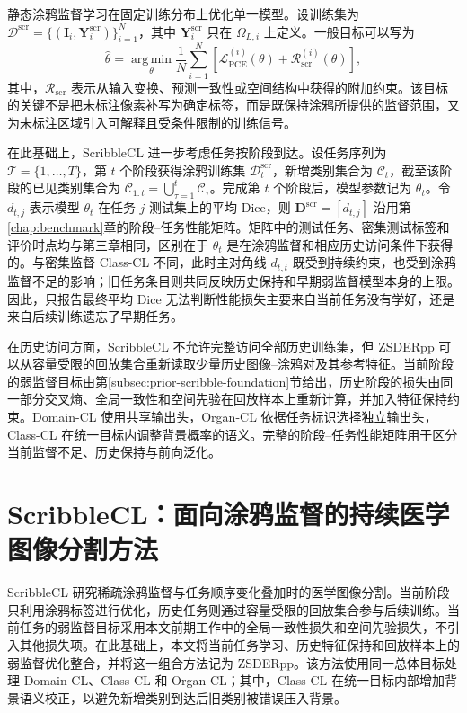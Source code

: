 静态涂鸦监督学习在固定训练分布上优化单一模型。设训练集为
$\mathcal{D}^{\mathrm{scr}}=\{(\mathbf{I}_i,\mathbf{Y}^{\mathrm{scr}}_i)\}_{i=1}^{N}$，其中
$\mathbf{Y}^{\mathrm{scr}}_i$ 只在 $\Omega_{L,i}$ 上定义。一般目标可以写为
\begin{equation}
\widehat{\theta}
=
\operatorname*{arg\,min}_{\theta}
\frac{1}{N}\sum_{i=1}^{N}
\left[
\mathcal{L}_{\mathrm{PCE}}^{(i)}(\theta)
+
\mathcal{R}_{\mathrm{scr}}^{(i)}(\theta)
\right],
\label{eq:scribble-static-objective}
\end{equation}
其中，$\mathcal{R}_{\mathrm{scr}}$ 表示从输入变换、预测一致性或空间结构中获得的附加约束。该目标的关键不是把未标注像素补写为确定标签，而是既保持涂鸦所提供的监督范围，又为未标注区域引入可解释且受条件限制的训练信号。

在此基础上，ScribbleCL 进一步考虑任务按阶段到达。设任务序列为
$\mathcal{T}=\{1,\ldots,T\}$，第 $t$ 个阶段获得涂鸦训练集
$\mathcal{D}^{\mathrm{scr}}_t$，新增类别集合为 $\mathcal{C}_t$，截至该阶段的已见类别集合为
$\mathcal{C}_{1:t}=\bigcup_{\tau=1}^{t}\mathcal{C}_{\tau}$。完成第 $t$ 个阶段后，模型参数记为 $\theta_t$。令
$d_{t,j}$ 表示模型 $\theta_t$ 在任务 $j$ 测试集上的平均 Dice，则
$\mathbf{D}^{\mathrm{scr}}=[d_{t,j}]$ 沿用第\ref{chap:benchmark}章的阶段--任务性能矩阵。矩阵中的测试任务、密集测试标签和评价时点均与第三章相同，区别在于 $\theta_t$ 是在涂鸦监督和相应历史访问条件下获得的。与密集监督 Class-CL 不同，此时主对角线 $d_{t,t}$ 既受到持续约束，也受到涂鸦监督不足的影响；旧任务条目则共同反映历史保持和早期弱监督模型本身的上限。因此，只报告最终平均 Dice 无法判断性能损失主要来自当前任务没有学好，还是来自后续训练遗忘了早期任务。

在历史访问方面，ScribbleCL 不允许完整访问全部历史训练集，但 ZSDERpp 可以从容量受限的回放集合重新读取少量历史图像--涂鸦对及其参考特征。当前阶段的弱监督目标由第\ref{subsec:prior-scribble-foundation}节给出，历史阶段的损失由同一部分交叉熵、全局一致性和空间先验在回放样本上重新计算，并加入特征保持约束。Domain-CL 使用共享输出头，Organ-CL 依据任务标识选择独立输出头，Class-CL 在统一目标内调整背景概率的语义。完整的阶段--任务性能矩阵用于区分当前监督不足、历史保持与前向泛化。

\section{ScribbleCL：面向涂鸦监督的持续医学图像分割方法}
\label{sec:scribblecl}

ScribbleCL 研究稀疏涂鸦监督与任务顺序变化叠加时的医学图像分割。当前阶段只利用涂鸦标签进行优化，历史任务则通过容量受限的回放集合参与后续训练。当前任务的弱监督目标采用本文前期工作中的全局一致性损失和空间先验损失\cite{zhang2026zscribbleseg}，不引入其他损失项。在此基础上，本文将当前任务学习、历史特征保持和回放样本上的弱监督优化整合，并将这一组合方法记为 ZSDERpp。该方法使用同一总体目标处理 Domain-CL、Class-CL 和 Organ-CL；其中，Class-CL 在统一目标内部增加背景语义校正，以避免新增类别到达后旧类别被错误压入背景\cite{cermelli2020mib}。

